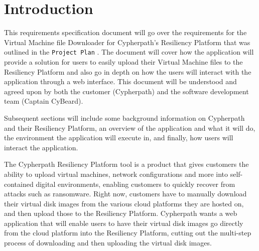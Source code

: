 \documentclass{article}
\begin{document}
    


    \tableofcontents
    \newpage
    \listoffigures


    \newpage
    \begin{versionhistory}
    \end{versionhistory}
    \newpage


    \section{Introduction}
    This requirements specification document will go over the requirements for the Virtual Machine file Downloader for Cypherpath's Resiliency Platform that was outlined in the
    \texttt{Project Plan} \cite{projectplan}.
    The document will cover how the application will provide a solution for users to easily upload their Virtual Machine files to the Resiliency Platform and also
    go in depth on how the users will interact with the application through a web interface. This document will be understood and agreed
    upon by both the customer (Cypherpath) and the software development team (Captain CyBeard).

    Subsequent sections will include some background information on Cypherpath and their Resiliency Platform, an overview of the application and what it
    will do, the environment the application will execute in, and finally, how users will interact the application.

	The Cypherpath Resiliency Platform tool is a product that gives customers the ability to upload virtual machines, network configurations and more into 
    self-contained digital environments, enabling customers to quickly recover from attacks such as ransomware. Right now, customers have to manually download their virtual disk images from
    the various cloud platforms they are hosted on, and then upload those to the Resiliency Platform. Cypherpath wants a web application that will enable users to have their virtual disk images go
    directly from the cloud platform into the Resiliency Platform, cutting out the multi-step process of downloading and then uploading the virtual disk images.
	
\end{document}
